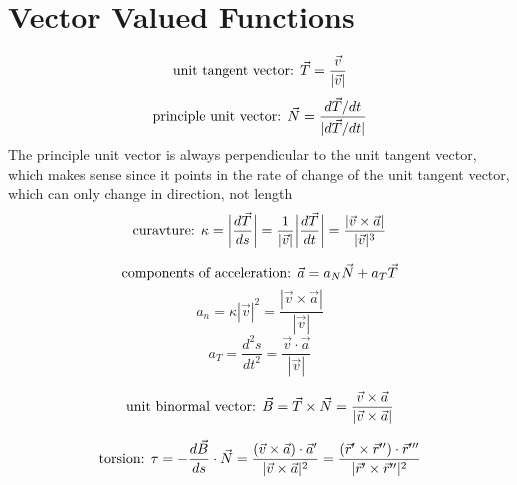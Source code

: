 \documentclass{article}
\begin{document}
\section{Vector Valued Functions}
$$\textnormal{unit tangent vector: } \vec{T} = \frac{\vec{v}}{|\vec{v}|}$$
$$\textnormal{principle unit vector: } \vec{N} = \frac{d\vec{T}/dt}{|d\vec{T}/dt|}$$
The principle unit vector is always perpendicular to the unit tangent vector, which makes sense since it points in the rate of change of the unit tangent vector, which can only change in direction, not length
$$\textnormal{curavture: } \kappa = \bigg |\frac{d\vec{T}}{ds} \bigg | = \frac{1}{|\vec{v}|} \bigg | \frac{d\vec{T}}{dt} \bigg | = \frac{|\vec{v} \times \vec{a} |}{ |\vec{v}|^3}$$

$$\textnormal{components of acceleration: } \vec{a} = a_N \vec{N} + a_T \vec{T}$$
$$a_n = \kappa |\vec{v}|^2 = \frac{|\vec{v} \times \vec{a}|}{|\vec{v}|}$$
$$a_T = \frac{d^2 s}{dt^2} = \frac{\vec{v} \cdot \vec{a}}{|\vec{v}|}$$

$$\textnormal{unit binormal vector: } \vec{B} = \vec{T} \times \vec{N} = \frac{\vec{v} \times \vec{a}}{|\vec{v} \times \vec{a}|}$$

$$\textnormal{torsion: } \tau = - \frac{d\vec{B}}{ds} \cdot \vec{N} = \frac{(\vec{v} \times \vec{a}) \cdot \vec{a}'}{|\vec{v} \times \vec{a}|^2} = \frac{(\vec{r}' \times \vec{r}'') \cdot \vec{r}'''}{|\vec{r}' \times \vec{r}''|^2}$$
\end{document}
